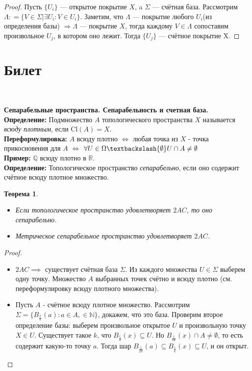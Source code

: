 \documentclass[a4paper,100pt]{article}
\theoremstyle{indented}
\newtheorem{theorem}{Теорема}
\begin{document}
    \begin{proof}
        
        Пусть $\{U_i\}$ --- открытое покрытие $X$, a $\Sigma$ --- счётная база. Рассмотрим $\Lambda: = \{V \in \Sigma | \exists U_i: V \in U_i\}$. Заметим, что $\Lambda$ --- покрытие любого $U_i$(из определения базы) $\Rightarrow \Lambda$ --- покрытие $X$, тогда каждому $V \in \Lambda$ сопоставим произвольное $U_j$, в котором оно лежит. Тогда $\{U_j\}$ --- счётное покрытие X. 
    \end{proof}

\section{Билет} \

\medskip

\textbf{Сепарабельные пространства. Сепарабельность и счетная база.}\\

\textbf{Определение:} Подмножество $A$ топологического пространства $X$ называется \textit{всюду плотным}, если $\text{Cl}(A)=X$.
\\

\textbf{Переформулировка:} $A$ всюду плотно $\Longleftrightarrow$ любая точка из $X$ - точка прикосновения для $A$ $\Longleftrightarrow$ $\forall U \in \Omega \textbackslash \{\emptyset \} U \cap A \neq \emptyset$
\\

\textbf{Пример:} $\mathbb{Q}$ всюду плотно в $\mathbb{R}$.
\\

\textbf{Определение:} Топологическое пространство \textit{сепарабельно}, если оно содержит счётное всюду плотное множество.\\

\begin{theorem}
~
\begin{itemize}
    \item Если топологическое пространство удовлетворяет $2AC$, то оно сепарабельно.
    \item Метрическое сепарабельное пространство удовлетворяет $2AC$.
\end{itemize}
\end{theorem}
\begin{proof}
~
\begin{itemize}
    \item $2AC \implies $ существует счётная база $\Sigma$. Из каждого множества $U \in \Sigma$ выберем одну точку. Множество $A$ выбранных точек счётно и всюду плотно (см. переформулировку всюду плотного множества).
    \item Пусть $A$ - счётное всюду плотное множество. Рассмотрим $\Sigma=\{B_{\frac{1}{n}}(a) : a \in A, \in \mathbb{N}\}$, докажем, что это база. Проверим второе определение базы: выберем произвольное открытое $U$ и произвольную точку $X \in U$. Существует такое $k$, что $B_{\frac{1}{k}}(x) \subseteq U$. Но $B_{\frac{1}{2k}}(x) \cap A \neq \emptyset$, то есть содержит какую-то точку $a$. Тогда шар $B_{\frac{1}{2k}}(a) \subseteq B_{\frac{1}{k}}(x) \subseteq U$, и он открыт.
\end{itemize}
\end{proof}
\end{document}
